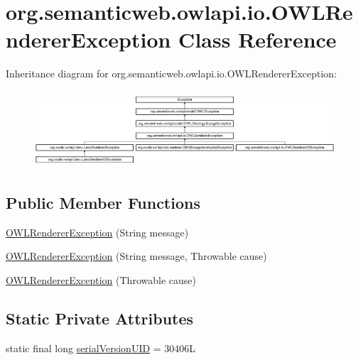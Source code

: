 \hypertarget{classorg_1_1semanticweb_1_1owlapi_1_1io_1_1_o_w_l_renderer_exception}{\section{org.\-semanticweb.\-owlapi.\-io.\-O\-W\-L\-Renderer\-Exception Class Reference}
\label{classorg_1_1semanticweb_1_1owlapi_1_1io_1_1_o_w_l_renderer_exception}
}
Inheritance diagram for org.\-semanticweb.\-owlapi.\-io.\-O\-W\-L\-Renderer\-Exception\-:\begin{figure}[H]
\begin{center}
\leavevmode
\includegraphics[height=2.886598cm]{classorg_1_1semanticweb_1_1owlapi_1_1io_1_1_o_w_l_renderer_exception}
\end{center}
\end{figure}
\subsection*{Public Member Functions}
\begin{DoxyCompactItemize}
\item 
\hyperlink{classorg_1_1semanticweb_1_1owlapi_1_1io_1_1_o_w_l_renderer_exception_a623c83d5efd7089acf680b643a236f7e}{O\-W\-L\-Renderer\-Exception} (String message)
\item 
\hyperlink{classorg_1_1semanticweb_1_1owlapi_1_1io_1_1_o_w_l_renderer_exception_a5f1e8ad2728dfa31799411d71e2eab50}{O\-W\-L\-Renderer\-Exception} (String message, Throwable cause)
\item 
\hyperlink{classorg_1_1semanticweb_1_1owlapi_1_1io_1_1_o_w_l_renderer_exception_a22d6b211a606fc9a9bf06de25fdf3e08}{O\-W\-L\-Renderer\-Exception} (Throwable cause)
\end{DoxyCompactItemize}
\subsection*{Static Private Attributes}
\begin{DoxyCompactItemize}
\item 
static final long \hyperlink{classorg_1_1semanticweb_1_1owlapi_1_1io_1_1_o_w_l_renderer_exception_a4ecee2e84cef35d2a9f77305bd3c9896}{serial\-Version\-U\-I\-D} = 30406\-L
\end{DoxyCompactItemize}
